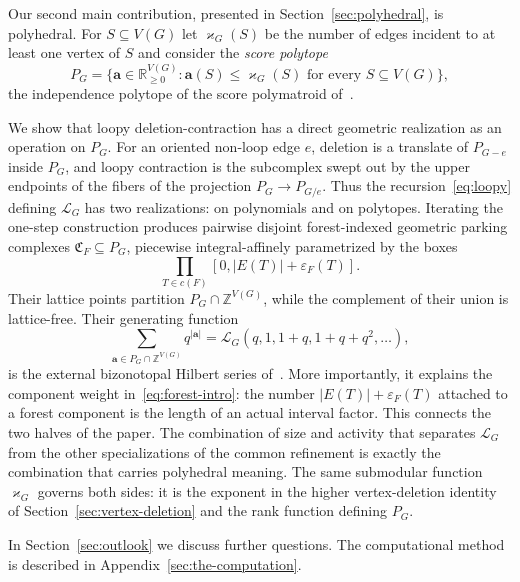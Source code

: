 \documentclass[11pt]{article}
\theoremstyle{plain}
\theoremstyle{definition}
\renewcommand{\mathcal}{\mathscr}
\newcommand{\LL}{\mathcal{L}}    %
\newcommand{\fC}{\mathfrak C}    %
\newcommand{\ba}{\mathbf{a}}
\newcommand{\eps}{\varepsilon}
\newcommand{\kp}{\varkappa}
\newcommand{\ZZ}{\mathbb Z}
\newcommand{\RR}{\mathbb R}
\numberwithin{equation}{section}
\begin{document}
Our second main contribution, presented in Section~\ref{sec:polyhedral}, is polyhedral.
For $S\subseteq V(G)$ let $\kp_G(S)$ be the number
of edges incident to at least one vertex of $S$ and consider the \emph{score polytope}
\[
   P_G=
   \{\ba\in\RR_{\ge 0}^{V(G)}:\ba(S)\le\kp_G(S)
      \text{ for every }S\subseteq V(G)\},
\]
 the independence polytope of the score polymatroid of~\cite{KNSV}.

We show that loopy deletion-contraction has a direct geometric realization as an operation on
$P_G$. For an oriented non-loop edge $e$, deletion is a translate of $P_{G-e}$ inside $P_G$,
and loopy contraction is the subcomplex swept
out by the upper endpoints of the fibers of the projection $P_G\to P_{G/e}$.
Thus the recursion~\eqref{eq:loopy} defining $\LL_G$ has two realizations: on polynomials and on polytopes.
Iterating the one-step
construction produces pairwise disjoint forest-indexed geometric parking complexes $\fC_F\subseteq P_G$,
piecewise integral-affinely parametrized by the boxes
\[
   \prod_{T\in c(F)}[0,|E(T)|+\eps_F(T)].
\]
Their lattice points partition $P_G\cap\ZZ^{V(G)}$, while the complement of their union is lattice-free.
Their generating function
\[
   \sum_{\ba\in P_G\cap\ZZ^{V(G)}}q^{|\ba|}
   =
   \LL_G(q,1,1+q,1+q+q^2,\ldots),
\]
is the external bizonotopal Hilbert series of~\cite{KNSV}.  More importantly, it explains the component weight in~\eqref{eq:forest-intro}: the number
$|E(T)|+\eps_F(T)$ attached to a forest component is the length of an actual interval factor.
This connects the two halves of the paper.
The combination of size and activity that
separates $\LL_G$ from the other specializations of the common refinement is exactly the combination that carries polyhedral meaning.
The same submodular function $\kp_G$ governs
both sides: it is the exponent in the higher vertex-deletion identity of
Section~\ref{sec:vertex-deletion} and the rank function defining $P_G$.

In Section~\ref{sec:outlook} we discuss further questions.
The computational method is described in
Appendix~\ref{sec:the-computation}.
\end{document}
